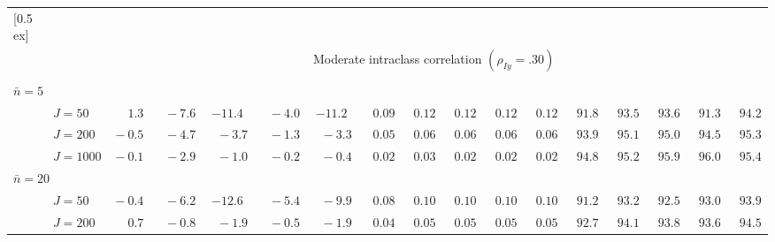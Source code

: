 \begin{sidewaystable}
\begin{threeparttable}
\begin{tabular}{llccccccccccccccc}
[0.5ex]\hline\\[-1.6ex] 
& & \multicolumn{15}{c}{Moderate intraclass correlation $(\rho_{Iy}=.30)$} \\[0.6ex]\hline\\[-1.8ex]
\multicolumn{4}{l}{$\bar{n}=5$} \\  & \nopagebreak $\;J=50$  & $\phantom{0}\phantom{-}1.3\phantom{0}$ & $\phantom{0}{-}7.6\phantom{0}$ & ${-}11.4\phantom{0}$ & $\phantom{0}{-}4.0\phantom{0}$ & ${-}11.2\phantom{0}$ & $\phantom{0}0.09\phantom{0}$ & $\phantom{0}0.12\phantom{0}$ & $\phantom{0}0.12\phantom{0}$ & $\phantom{0}0.12\phantom{0}$ & $\phantom{0}0.12\phantom{0}$ & $\phantom{0}91.8\phantom{0}$ & $\phantom{0}93.5\phantom{0}$ & $\phantom{0}93.6\phantom{0}$ & $\phantom{0}91.3\phantom{0}$ & $\phantom{0}94.2\phantom{0}$ \\
 & \nopagebreak $\;J=200$  & $\phantom{0}{-}0.5\phantom{0}$ & $\phantom{0}{-}4.7\phantom{0}$ & $\phantom{0}{-}3.7\phantom{0}$ & $\phantom{0}{-}1.3\phantom{0}$ & $\phantom{0}{-}3.3\phantom{0}$ & $\phantom{0}0.05\phantom{0}$ & $\phantom{0}0.06\phantom{0}$ & $\phantom{0}0.06\phantom{0}$ & $\phantom{0}0.06\phantom{0}$ & $\phantom{0}0.06\phantom{0}$ & $\phantom{0}93.9\phantom{0}$ & $\phantom{0}95.1\phantom{0}$ & $\phantom{0}95.0\phantom{0}$ & $\phantom{0}94.5\phantom{0}$ & $\phantom{0}95.3\phantom{0}$ \\
 & \nopagebreak $\;J=1000$  & $\phantom{0}{-}0.1\phantom{0}$ & $\phantom{0}{-}2.9\phantom{0}$ & $\phantom{0}{-}1.0\phantom{0}$ & $\phantom{0}{-}0.2\phantom{0}$ & $\phantom{0}{-}0.4\phantom{0}$ & $\phantom{0}0.02\phantom{0}$ & $\phantom{0}0.03\phantom{0}$ & $\phantom{0}0.02\phantom{0}$ & $\phantom{0}0.02\phantom{0}$ & $\phantom{0}0.02\phantom{0}$ & $\phantom{0}94.8\phantom{0}$ & $\phantom{0}95.2\phantom{0}$ & $\phantom{0}95.9\phantom{0}$ & $\phantom{0}96.0\phantom{0}$ & $\phantom{0}95.4\phantom{0}$ \\
\multicolumn{4}{l}{$\bar{n}=20$} \\  & \nopagebreak $\;J=50$  & $\phantom{0}{-}0.4\phantom{0}$ & $\phantom{0}{-}6.2\phantom{0}$ & ${-}12.6\phantom{0}$ & $\phantom{0}{-}5.4\phantom{0}$ & $\phantom{0}{-}9.9\phantom{0}$ & $\phantom{0}0.08\phantom{0}$ & $\phantom{0}0.10\phantom{0}$ & $\phantom{0}0.10\phantom{0}$ & $\phantom{0}0.10\phantom{0}$ & $\phantom{0}0.10\phantom{0}$ & $\phantom{0}91.2\phantom{0}$ & $\phantom{0}93.2\phantom{0}$ & $\phantom{0}92.5\phantom{0}$ & $\phantom{0}93.0\phantom{0}$ & $\phantom{0}93.9\phantom{0}$ \\
 & \nopagebreak $\;J=200$  & $\phantom{0}\phantom{-}0.7\phantom{0}$ & $\phantom{0}{-}0.8\phantom{0}$ & $\phantom{0}{-}1.9\phantom{0}$ & $\phantom{0}{-}0.5\phantom{0}$ & $\phantom{0}{-}1.9\phantom{0}$ & $\phantom{0}0.04\phantom{0}$ & $\phantom{0}0.05\phantom{0}$ & $\phantom{0}0.05\phantom{0}$ & $\phantom{0}0.05\phantom{0}$ & $\phantom{0}0.05\phantom{0}$ & $\phantom{0}92.7\phantom{0}$ & $\phantom{0}94.1\phantom{0}$ & $\phantom{0}93.8\phantom{0}$ & $\phantom{0}93.6\phantom{0}$ & $\phantom{0}94.5\phantom{0}$ \\

\end{tabular}
\end{threeparttable}
\end{sidewaystable}
